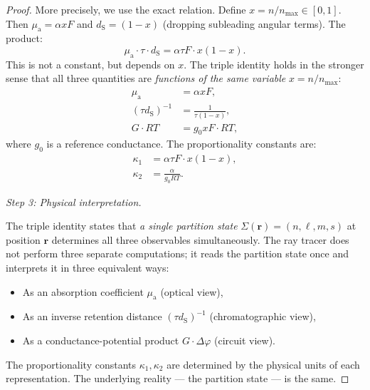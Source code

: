 \documentclass[11pt,twocolumn,a4paper]{article}
\newcommand{\dS}{d_{\mathrm{S}}}
\newcommand{\muabs}{\mu_{\mathrm{a}}}
\begin{document}
\begin{proof}
More precisely, we use the exact relation. Define $x = n/n_{\max} \in
[0,1]$. Then $\muabs = \alpha x F$ and $\dS = (1-x)$ (dropping
subleading angular terms). The product:
\begin{equation}
\muabs \cdot \tau \cdot \dS = \alpha \tau F \cdot x(1-x).
\end{equation}
This is not a constant, but depends on $x$. The triple identity holds
in the stronger sense that all three quantities are \emph{functions of
the same variable} $x = n/n_{\max}$:
\begin{align}
\muabs &= \alpha x F, \label{eq:mu-x}\\
(\tau \dS)^{-1} &= \frac{1}{\tau(1-x)}, \label{eq:ds-x}\\
G \cdot RT &= g_0 x F \cdot RT, \label{eq:g-x}
\end{align}
where $g_0$ is a reference conductance. The proportionality constants
are:
\begin{align}
\kappa_1 &= \alpha \tau F \cdot x(1-x), \label{eq:kappa1}\\
\kappa_2 &= \frac{\alpha}{g_0 RT}. \label{eq:kappa2}
\end{align}

\textit{Step 3: Physical interpretation.}

The triple identity states that \emph{a single partition state}
$\Sigma(\mathbf{r}) = (n, \ell, m, s)$ at position $\mathbf{r}$
determines all three observables simultaneously. The ray tracer does
not perform three separate computations; it reads the partition state
once and interprets it in three equivalent ways:
\begin{itemize}[leftmargin=*]
\item As an absorption coefficient $\muabs$ (optical view),
\item As an inverse retention distance $(\tau \dS)^{-1}$
  (chromatographic view),
\item As a conductance-potential product $G \cdot \Delta\varphi$
  (circuit view).
\end{itemize}

The proportionality constants $\kappa_1, \kappa_2$ are determined by
the physical units of each representation. The underlying reality ---
the partition state --- is the same.
\end{proof}

\end{document}
